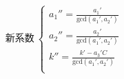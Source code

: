 \documentclass[preview]{standalone}
\begin{document}
\begin{align*}
\text{新系数}~\begin{cases}a_1'' = \frac{a_1'}{\mathrm{gcd}(a_1', a_2')} \\a_2'' = \frac{a_2'}{\mathrm{gcd}(a_1', a_2')} \\k'' = \frac{k' - a_3' C}{\mathrm{gcd}(a_1', a_2')} \\\end{cases}
\end{align*}
\end{document}
